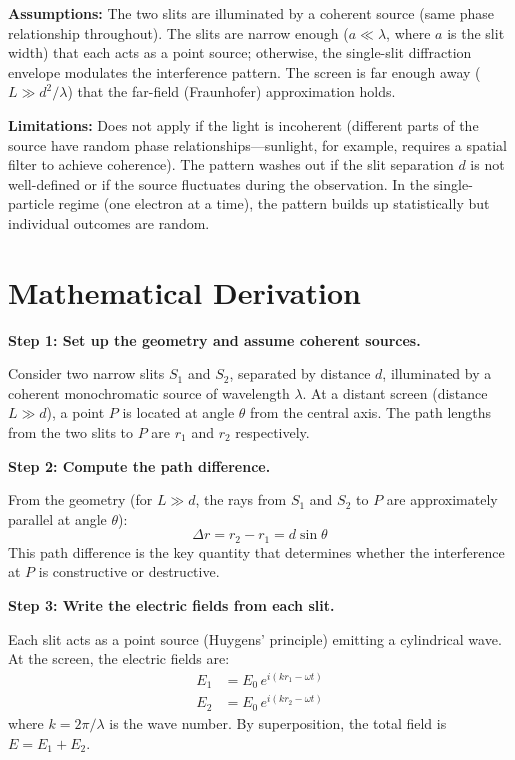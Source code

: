 \textbf{Assumptions:} The two slits are illuminated by a coherent source (same phase relationship throughout). The slits are narrow enough ($a \ll \lambda$, where $a$ is the slit width) that each acts as a point source; otherwise, the single-slit diffraction envelope modulates the interference pattern. The screen is far enough away ($L \gg d^2/\lambda$) that the far-field (Fraunhofer) approximation holds.


\textbf{Limitations:} Does not apply if the light is incoherent (different parts of the source have random phase relationships---sunlight, for example, requires a spatial filter to achieve coherence). The pattern washes out if the slit separation $d$ is not well-defined or if the source fluctuates during the observation. In the single-particle regime (one electron at a time), the pattern builds up statistically but individual outcomes are random.


\section*{Mathematical Derivation}

\textbf{Step 1: Set up the geometry and assume coherent sources.}

Consider two narrow slits $S_1$ and $S_2$, separated by distance $d$, illuminated by a coherent monochromatic source of wavelength $\lambda$. At a distant screen (distance $L \gg d$), a point $P$ is located at angle $\theta$ from the central axis. The path lengths from the two slits to $P$ are $r_1$ and $r_2$ respectively.

\textbf{Step 2: Compute the path difference.}

From the geometry (for $L \gg d$, the rays from $S_1$ and $S_2$ to $P$ are approximately parallel at angle $\theta$):
\begin{equation}
\Delta r = r_2 - r_1 = d\sin\theta
\end{equation}
This path difference is the key quantity that determines whether the interference at $P$ is constructive or destructive.

\textbf{Step 3: Write the electric fields from each slit.}

Each slit acts as a point source (Huygens' principle) emitting a cylindrical wave. At the screen, the electric fields are:
\begin{align}
E_1 &= E_0\,e^{i(kr_1 - \omega t)} \\
E_2 &= E_0\,e^{i(kr_2 - \omega t)}
\end{align}
where $k = 2\pi/\lambda$ is the wave number. By superposition, the total field is $E = E_1 + E_2$.

